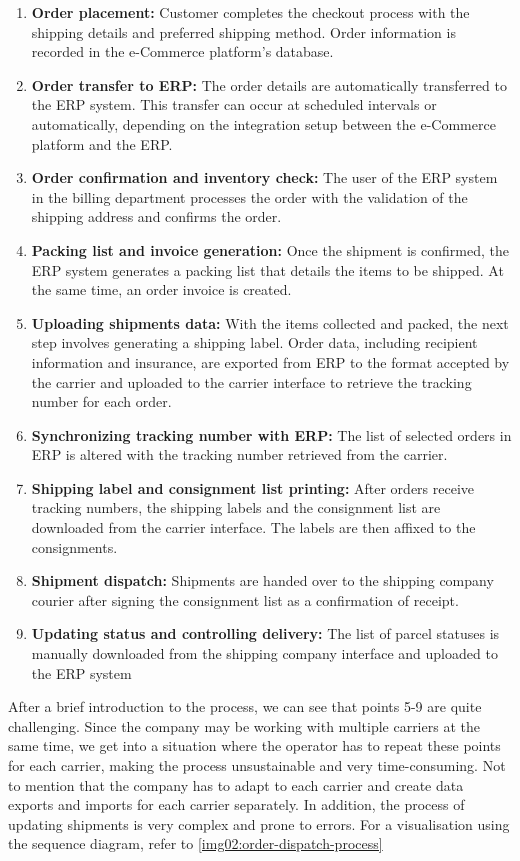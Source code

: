 \begin{enumerate}
    \item \textbf{Order placement:} Customer completes the checkout process with the shipping details and preferred shipping method. Order information is recorded in the e-Commerce platform's database.
    \item \textbf{Order transfer to \ac{ERP}:} The order details are automatically transferred to the \ac{ERP} system. This transfer can occur at scheduled intervals or automatically, depending on the integration setup between the e-Commerce platform and the \ac{ERP}.
    \item \textbf{Order confirmation and inventory check:} The user of the ERP system in the billing department processes the order with the validation of the shipping address and confirms the order.
    \item \textbf{Packing list and invoice generation:} Once the shipment is confirmed, the \ac{ERP} system generates a packing list that details the items to be shipped. At the same time, an order invoice is created.
    \item \textbf{Uploading shipments data:} With the items collected and packed, the next step involves generating a shipping label. Order data, including recipient information and insurance, are exported from \ac{ERP} to the format accepted by the carrier and uploaded to the carrier interface to retrieve the tracking number for each order.
    \item \textbf{Synchronizing tracking number with \ac{ERP}:} The list of selected orders in \ac{ERP} is altered with the tracking number retrieved from the carrier.
    \item \textbf{Shipping label and consignment list printing:} After orders receive tracking numbers, the shipping labels and the consignment list are downloaded from the carrier interface. The labels are then affixed to the consignments.
    \item \textbf{Shipment dispatch:} Shipments are handed over to the shipping company courier after signing the consignment list as a confirmation of receipt. 
    \item \textbf{Updating status and controlling delivery:} The list of parcel statuses is manually downloaded from the shipping company interface and uploaded to the \ac{ERP} system
\end{enumerate}

After a brief introduction to the process, we can see that points 5-9 are quite challenging.
Since the company may be working with multiple carriers at the same time, we get into a situation where the operator has to repeat these points for each carrier, making the process unsustainable and very time-consuming.
Not to mention that the company has to adapt to each carrier and create data exports and imports for each carrier separately.
In addition, the process of updating shipments is very complex and prone to errors.
For a visualisation using the sequence diagram, refer to \ref{img02:order-dispatch-process}


